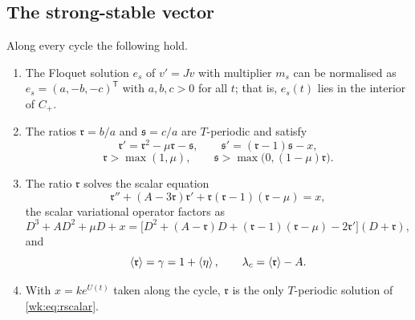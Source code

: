\subsection{The strong-stable vector}
\begin{lemma}\label{lem:strongstable}
Along every cycle the following hold.
\begin{enumerate}[label=\textup{(\alph*)}]
\item The Floquet solution $e_s$ of $v'=Jv$ with multiplier $m_s$ can be normalised as $e_s=(a,-b,-c)^{\mathsf T}$ with $a,b,c>0$ for all $t$; that is, $e_s(t)$ lies in the interior of $C_+$.
\item The ratios $\mathfrak r=b/a$ and $\mathfrak s=c/a$ are $T$-periodic and satisfy
\begin{equation}\label{wk:eq:ricc}
\mathfrak r'=\mathfrak r^2-\mu\mathfrak r-\mathfrak s,\qquad \mathfrak s'=(\mathfrak r-1)\mathfrak s-x,
\end{equation}
\begin{equation}\label{wk:eq:rbounds}
\mathfrak r>\max(1,\mu),\qquad \mathfrak s>\max\bigl(0,(1-\mu)\mathfrak r\bigr).
\end{equation}
\item The ratio $\mathfrak r$ solves the scalar equation
\begin{equation}\label{wk:eq:rscalar}
\mathfrak r''+(A-3\mathfrak r)\mathfrak r'+\mathfrak r(\mathfrak r-1)(\mathfrak r-\mu)=x ,
\end{equation}
the scalar variational operator factors as
\begin{equation}\label{wk:eq:rfactor}
D^3+AD^2+\mu D+x=\bigl[D^2+(A-\mathfrak r)D+(\mathfrak r-1)(\mathfrak r-\mu)-2\mathfrak r'\bigr](D+\mathfrak r),
\end{equation}
and
\begin{equation}\label{wk:eq:rmean}
\left\langle \mathfrak r\right\rangle=\gamma=1+\left\langle \eta\right\rangle,\qquad \lambda_c=\left\langle \mathfrak r\right\rangle-A .
\end{equation}
\item With $x=ke^{U(t)}$ taken along the cycle, $\mathfrak r$ is the only $T$-periodic solution of \eqref{wk:eq:rscalar}.
\end{enumerate}
\end{lemma}

